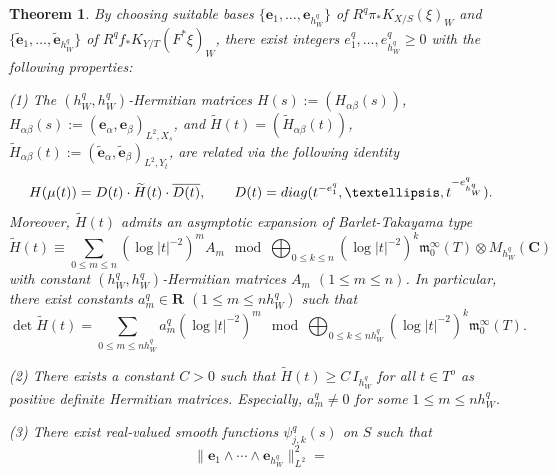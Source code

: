 \documentclass[10pt,a4paper]{amsart}
\newtheorem{theorem}{Theorem}
\begin{document}
\begin{theorem}
\label{thm:str:sing:L2}
By choosing suitable bases $\{ {\mathbf e}_{1},\ldots,{\mathbf e}_{h_{W}^{q}} \}$ of $R^{q}\pi_{*}K_{X/S}(\xi)_{W}$ and 
$\{ \widetilde{\mathbf e}_{1}, \ldots, \widetilde{\mathbf e}_{h_{W}^{q}}\}$ of $R^{q}f_{*}K_{Y/T}(F^{*}\xi)_{W}$,
there exist integers $e^{q}_{1},\ldots, e^{q}_{h_{W}^{q}} \geq0$ with the following properties:
\par{\rm (1) }
The $(h_{W}^{q}, h_{W}^{q})$-Hermitian matrices $H(s) := ( H_{\alpha\beta}(s) )$, 
$H_{\alpha\beta}(s) := ( {\mathbf e}_{\alpha} , {\mathbf e}_{\beta} )_{L^{2},X_{s}}$, and
$\widetilde{H}(t) = ( \widetilde{H}_{\alpha\beta}(t) )$, 
$\widetilde{H}_{\alpha\beta}(t) := ( \widetilde{\mathbf e}_{\alpha} , \widetilde{\mathbf e}_{\beta} )_{L^{2},Y_{t}}$, 
are related via the following identity
\begin{equation}
\label{eqn:decomp:H}
H(\mu(t)) = D(t)\cdot \widetilde{H}(t)\cdot\overline{D(t)},
\qquad
D(t) = {\rm diag}( t^{-e^{q}_{1}},\ldots,t^{-e^{q}_{h_{W}^{q}}} ).
\end{equation}
Moreover, $\widetilde{H}(t)$ admits an asymptotic expansion of Barlet-Takayama type
\begin{equation}
\label{eqn:asym:exp:H:2}
\widetilde{H}(t) \equiv \sum_{0\leq m \leq n} (\log |t|^{-2})^{m} A_{m} 
\mod \bigoplus_{0\leq k \leq n} (\log |t|^{-2})^{k} {\mathfrak m}^{\infty}_{0}(T) \otimes M_{h_{W}^{q}}( {\mathbf C} )
\end{equation}
with constant $(h_{W}^{q}, h_{W}^{q})$-Hermitian matrices $A_{m}$ $(1\leq m \leq n)$. 
In particular, there exist constants $a_{m}^{q} \in {\mathbf R}$ $( 1 \leq m \leq n h_{W}^{q})$ such that 
\begin{equation}
\label{eqn:asym:exp:det:H:2}
\det \widetilde{H}(t) = \sum_{0 \leq m \leq n h_{W}^{q}} a_{m}^{q} (\log |t|^{-2})^{m} 
\mod \bigoplus_{0\leq k \leq n h_{W}^{q}} (\log |t|^{-2})^{k} {\mathfrak m}^{\infty}_{0}(T).
\end{equation}
\par{\rm (2) }
There exists a constant $C>0$ such that $\widetilde{H}(t) \geq C\,I_{h_{W}^{q}}$ for all $t\in T^{o}$ as positive definite Hermitian matrices.
Especially, $a_{m}^{q} \not=0$ for some $1 \leq m \leq n h_{W}^{q}$.
\par{\rm (3) }
There exist real-valued smooth functions $\psi_{j,k}^{q}(s)$ on $S$ such that
\begin{equation}
\label{eqn:L2:asym:eqv}
\| {\mathbf e}_{1}\wedge \cdots\wedge {\mathbf e}_{h_{W}^{q}} \|_{L^{2}}^{2} =

\end{equation}
\end{theorem}
\end{document}
